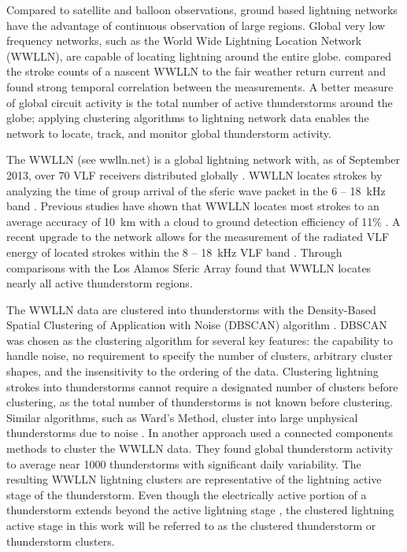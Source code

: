 Compared to satellite and balloon observations, ground based lightning networks have the advantage of continuous observation of large regions.
Global very low frequency networks, such as the World Wide Lightning Location Network (WWLLN), are capable of locating lightning around the entire globe.
\citet{Holzworth2005} compared the stroke counts of a nascent WWLLN to the fair weather return current and found strong temporal correlation between the measurements.
A better measure of global circuit activity is the total number of active thunderstorms around the globe; applying clustering algorithms to lightning network data enables the network to locate, track, and monitor global thunderstorm activity.

The WWLLN (see wwlln.net) is a global lightning network with, as of September 2013, over 70 VLF receivers distributed globally \citep{Rodger2006, Rodger2009}.
WWLLN locates strokes by analyzing the time of group arrival of the sferic wave packet in the 6 -- 18~kHz band \citep{Dowden2000}.
Previous studies have shown that WWLLN locates most strokes to an average accuracy of 10~km with a cloud to ground detection efficiency of 11\% \citep{Rodger2009, Abarca2010, Hutchins2012a, Rudlosky2013}.
A recent upgrade to the network allows for the measurement of the radiated VLF energy of located strokes within the 8 -- 18~kHz VLF band \citep{Hutchins2012}.
Through comparisons with the Los Alamos Sferic Array \citet{Jacobson2006c} found that WWLLN locates nearly all active thunderstorm regions.

The WWLLN data are clustered into thunderstorms with the Density-Based Spatial Clustering of Application with Noise (DBSCAN) algorithm \citep{Ester1996, Kriegel2011a}.
DBSCAN was chosen as the clustering algorithm for several key features: the capability to handle noise, no requirement to specify the number of clusters, arbitrary cluster shapes, and the insensitivity to the ordering of the data.
Clustering lightning strokes into thunderstorms cannot require a designated number of clusters before clustering, as the total number of thunderstorms is not known before clustering.
Similar algorithms, such as Ward's Method, cluster into large unphysical thunderstorms due to noise \citep{Ward1963}.
In another approach \citet{Mezuman2013a} used a connected components methods to cluster the WWLLN data.
They found global thunderstorm activity to average near 1000 thunderstorms with significant daily variability.
The resulting WWLLN lightning clusters are representative of the lightning active stage of the thunderstorm.
Even though the electrically active portion of a thunderstorm extends beyond the active lightning stage \citep{Jacobson1976, Stolzenburg2010}, the clustered lightning active stage in this work will be referred to as the clustered thunderstorm or thunderstorm clusters.

